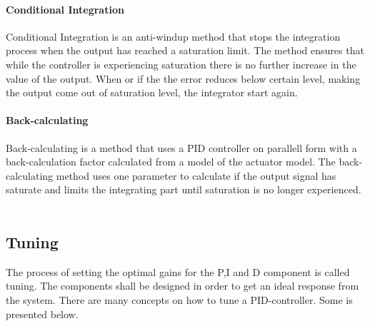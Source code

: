 \paragraph{Conditional Integration}
Conditional Integration is an anti-windup method that stops the integration process when the output has reached a saturation limit. The method ensures that while the controller is experiencing saturation there is no further increase in the value of the output. When or if the the error reduces below certain level, making the output come out of saturation level, the integrator start again. \cite{clamping}
\paragraph{Back-calculating}
Back-calculating is a method that uses a PID controller on parallell form with a back-calculation factor calculated from a model of the actuator model. The back-calculating method uses one parameter to calculate if the output signal has saturate and limits the integrating part until saturation is no longer experienced.\cite{clamping}\\
\\
\subsection{Tuning}
The process of setting the optimal gains for the P,I and D component is called tuning. The components shall be designed in order to get an ideal response from the system. There are many concepts on how to tune a PID-controller. Some is presented below.\\
\\
